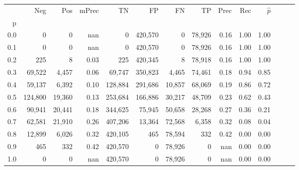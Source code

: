\begin{tabular}{rrrrrrrrrrrrrr}
\toprule
{} &      Neg &     Pos & mPrec &       TN &       FP &      FN &      TP &  Prec &   Rec & $\hat{p}$ \\
p   &          &         &       &          &          &         &         &       &       &           \\
\midrule
0.0 &        0 &       0 &   nan &        0 &  420,570 &       0 &  78,926 &  0.16 &  1.00 &      1.00 \\
0.1 &        0 &       0 &   nan &        0 &  420,570 &       0 &  78,926 &  0.16 &  1.00 &      1.00 \\
0.2 &      225 &       8 &  0.03 &      225 &  420,345 &       8 &  78,918 &  0.16 &  1.00 &      1.00 \\
0.3 &   69,522 &   4,457 &  0.06 &   69,747 &  350,823 &   4,465 &  74,461 &  0.18 &  0.94 &      0.85 \\
0.4 &   59,137 &   6,392 &  0.10 &  128,884 &  291,686 &  10,857 &  68,069 &  0.19 &  0.86 &      0.72 \\
0.5 &  124,800 &  19,360 &  0.13 &  253,684 &  166,886 &  30,217 &  48,709 &  0.23 &  0.62 &      0.43 \\
0.6 &   90,941 &  20,441 &  0.18 &  344,625 &   75,945 &  50,658 &  28,268 &  0.27 &  0.36 &      0.21 \\
0.7 &   62,581 &  21,910 &  0.26 &  407,206 &   13,364 &  72,568 &   6,358 &  0.32 &  0.08 &      0.04 \\
0.8 &   12,899 &   6,026 &  0.32 &  420,105 &      465 &  78,594 &     332 &  0.42 &  0.00 &      0.00 \\
0.9 &      465 &     332 &  0.42 &  420,570 &        0 &  78,926 &       0 &   nan &  0.00 &      0.00 \\
1.0 &        0 &       0 &   nan &  420,570 &        0 &  78,926 &       0 &   nan &  0.00 &      0.00 \\
\bottomrule
\end{tabular}
